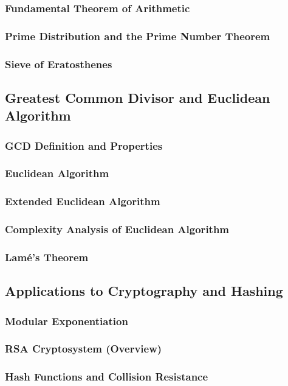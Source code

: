 \subsubsection{Fundamental Theorem of Arithmetic}
\subsubsection{Prime Distribution and the Prime Number Theorem}
\subsubsection{Sieve of Eratosthenes}

\subsection{Greatest Common Divisor and Euclidean Algorithm}
\subsubsection{GCD Definition and Properties}
\subsubsection{Euclidean Algorithm}
\subsubsection{Extended Euclidean Algorithm}
\subsubsection{Complexity Analysis of Euclidean Algorithm}
\subsubsection{Lamé's Theorem}

\subsection{Applications to Cryptography and Hashing}
\subsubsection{Modular Exponentiation}
\subsubsection{RSA Cryptosystem (Overview)}
\subsubsection{Hash Functions and Collision Resistance}
